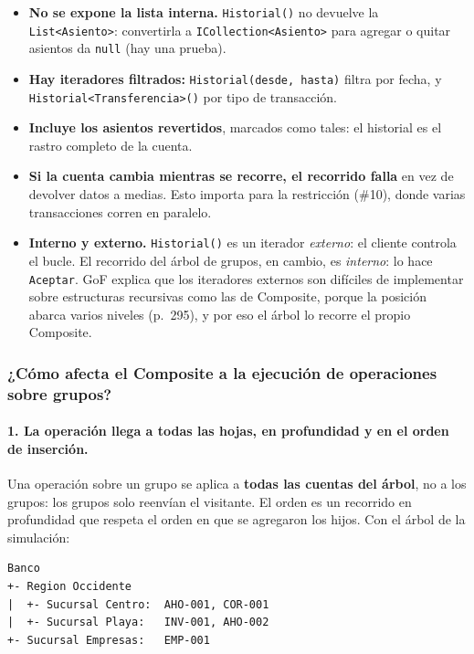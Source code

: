 \begin{itemize}
  \item \textbf{No se expone la lista interna.} \texttt{Historial()} no devuelve la
        \texttt{List<Asiento>}: convertirla a \texttt{ICollection<Asiento>} para agregar o
        quitar asientos da \texttt{null} (hay una prueba).
  \item \textbf{Hay iteradores filtrados:} \texttt{Historial(\allowbreak{}desde, hasta)} filtra por fecha,
        y \texttt{Historial<\allowbreak{}Transferencia>()} por tipo de transacción.
  \item \textbf{Incluye los asientos revertidos}, marcados como tales: el historial es el
        rastro completo de la cuenta.
  \item \textbf{Si la cuenta cambia mientras se recorre, el recorrido falla} en vez de
        devolver datos a medias. Esto importa para la restricción (\#10), donde varias
        transacciones corren en paralelo.
  \item \textbf{Interno y externo.} \texttt{Historial()} es un iterador \emph{externo}: el
        cliente controla el bucle. El recorrido del árbol de grupos, en cambio, es
        \emph{interno}: lo hace \texttt{Aceptar}. GoF explica que los iteradores externos son
        difíciles de implementar sobre estructuras recursivas como las de Composite, porque la
        posición abarca varios niveles (p.~295), y por eso el árbol lo recorre el propio
        Composite.
\end{itemize}

\subsubsection{¿Cómo afecta el Composite a la ejecución de operaciones sobre grupos?}

\paragraph{1. La operación llega a todas las hojas, en profundidad y en el orden de inserción.}
Una operación sobre un grupo se aplica a \textbf{todas las cuentas del árbol}, no a los
grupos: los grupos solo reenvían el visitante. El orden es un recorrido en profundidad que
respeta el orden en que se agregaron los hijos. Con el árbol de la simulación:

\begin{lstlisting}[language={}, numbers=none, basicstyle=\ttfamily\footnotesize, columns=fullflexible, keepspaces=true]
Banco
+- Region Occidente
|  +- Sucursal Centro:  AHO-001, COR-001
|  +- Sucursal Playa:   INV-001, AHO-002
+- Sucursal Empresas:   EMP-001
\end{lstlisting}

